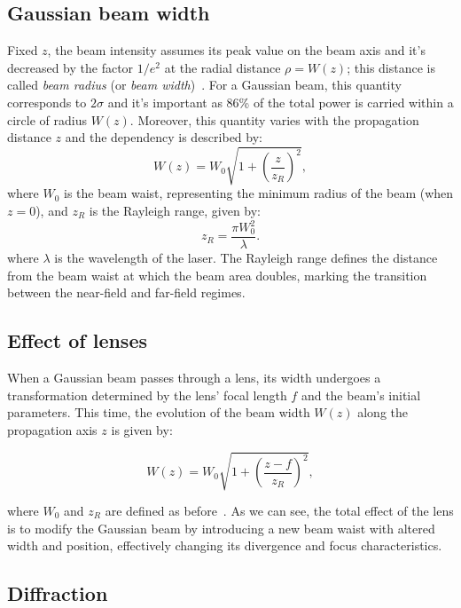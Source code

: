 \documentclass[prl,twocolumn]{revtex4-1}
\begin{document}
\subsection{Gaussian beam width}
\label{sec:gaussian_beam_width}
Fixed $z$, the beam intensity assumes its peak value on the beam axis and it's decreased by the factor $1/e^2$ at the radial distance $\rho = W(z)$; this distance is called \textit{beam radius} (or \textit{beam width})~\cite{pap1}. For a Gaussian beam, this quantity corresponds to $2\sigma$ and it's important as 86\% of the total power is carried within a circle of radius $W(z)$. Moreover, this quantity varies with the propagation distance $z$ and the dependency is described by:
\begin{equation}
\label{eq:beam_radius}
W(z) = W_0 \sqrt{1 + \left(\frac{z}{z_R}\right)^2},
\end{equation}
where $W_0$ is the beam waist, representing the minimum radius of the beam (when $z=0$), and $z_R$ is the Rayleigh range, given by:
\begin{equation}
\label{eq:W_0_and_z_R}
z_R = \frac{\pi W_0^2}{\lambda}.
\end{equation}
where $\lambda$ is the wavelength of the laser. The Rayleigh range defines the distance from the beam waist at which the beam area doubles, marking the transition between the near-field and far-field regimes.

\subsection{Effect of lenses}
When a Gaussian beam passes through a lens, its width undergoes a transformation determined by the lens' focal length $f$ and the beam's initial parameters. This time, the evolution of the beam width $W(z)$ along the propagation axis $z$ is given by:

\begin{equation}
\label{eq:beam_radius_lens}
W(z) = W_0 \sqrt{1 + \left( \frac{z - f}{z_R} \right)^2},
\end{equation}

where $W_0$ and $z_R$ are defined as before~\cite{pap1}. As we can see, the total effect of the lens is to modify the Gaussian beam by introducing a new beam waist with altered width and position, effectively changing its divergence and focus characteristics.

\subsection{Diffraction}
\label{sec:diffraction_theory}
\end{document}
